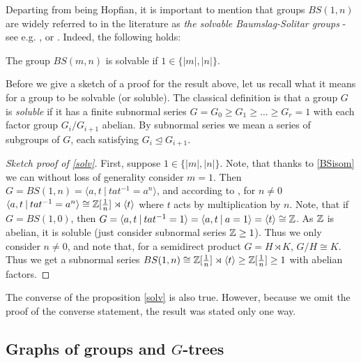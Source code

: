 Departing from being Hopfian, it is important to mention that groups $BS(1,n)$ are widely referred to in the literature as \emph{the solvable Baumslag-Solitar groups} - see e.g. \cite{BoDePu2018}, \cite{FaMo98} or \cite{Gr96}. Indeed, the following holds:

\begin{proposition}\label{solv}
    The group $BS(m,n)$ is solvable if $1 \in \{|m|,|n|\}$.
\end{proposition} 

\begin{remark}
    Before we give a sketch of a proof for the result above, let us recall what it means for a group to be solvable (or soluble). The classical definition is that a group $G$ is \emph{soluble} if it has a finite subnormal series $G = G_0 \ge G_1 \ge \ldots \ge G_r =1$ with each factor group $G_i/G_{i+1}$ abelian. By subnormal series we mean a series of subgroups of $G$, each satisfying $G_i \unlhd G_{i+1}$.
\end{remark}

\begin{proof}[Sketch proof of \ref{solv}]
    First, suppose $1 \in \{|m|,|n|\}$. Note, that thanks to \ref{BSisom} we can without loss of generality consider $m = 1$. Then $G = BS(1,n) = \langle a,t \: | \: tat^{-1} = a^n \rangle$, and according to \cite{Gi79}, for $n \neq 0$ $\langle a,t \: | \: tat^{-1} = a^n \rangle \cong \mathbb{Z}[\frac{1}{n}]\rtimes \langle t \rangle$ where $t$ acts by multiplication by $n$. Note, that if $G = BS(1,0)$, then $G = \langle a,t \: | \: tat^{-1} = 1 \rangle = \langle a,t \: | \: a = 1 \rangle = \langle t \rangle \cong \mathbb{Z}$. As $\mathbb{Z}$ is abelian, it is soluble (just consider subnormal series $\mathbb{Z} \ge 1$). Thus we only consider $n \neq 0$, and note that, for a semidirect product $G = H \rtimes K$, $G/H \cong K$. Thus we get a subnormal series $BS(1,n) \cong \mathbb{Z}[\frac{1}{n}]\rtimes \langle t \rangle \ge \mathbb{Z}[\frac{1}{n}] \ge 1$ with abelian factors.
\end{proof}

\begin{remark}
    The converse of the proposition \ref{solv} is also true. However, because we omit the proof of the converse statement, the result was stated only one way.
\end{remark}


\subsection{Graphs of groups and $G$-trees}

